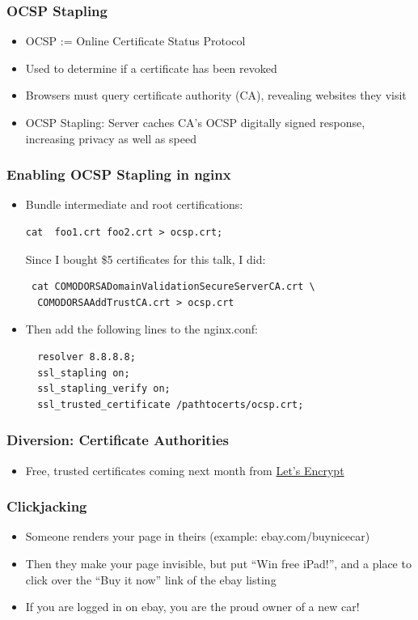 \documentclass[9pt]{beamer}
\begin{document}
\begin{frame}[fragile]
\frametitle{OCSP Stapling}
\begin{itemize}
\item OCSP := Online Certificate Status Protocol
\pause
\item Used to determine if a certificate has been revoked
\pause
\item Browsers must query certificate authority (CA), revealing websites they visit
\pause
\item OCSP Stapling: Server caches CA's OCSP digitally signed response, increasing privacy as well as speed
\end{itemize}
\end{frame}

\begin{frame}[fragile]
\frametitle{Enabling OCSP Stapling in nginx}
\begin{itemize}
\item Bundle intermediate and root certifications:
\begin{verbatim}
cat  foo1.crt foo2.crt > ocsp.crt;
\end{verbatim}
Since I bought \$5 certificates for this talk, I did:
\begin{verbatim}
 cat COMODORSADomainValidationSecureServerCA.crt \
  COMODORSAAddTrustCA.crt > ocsp.crt
\end{verbatim}
\pause
\item Then add the following lines to the nginx.conf:
\begin{verbatim}
  resolver 8.8.8.8;
  ssl_stapling on;
  ssl_stapling_verify on;
  ssl_trusted_certificate /pathtocerts/ocsp.crt;
\end{verbatim}
\end{itemize}
\end{frame}

\begin{frame}[fragile]
\frametitle{Diversion: Certificate Authorities}
\begin{itemize}
\item Free, trusted certificates coming next month from \href{https://letsencrypt.org/}{Let's Encrypt}
\end{itemize}
\end{frame}

\begin{frame}[fragile]
\frametitle{Clickjacking}
\begin{itemize}
\item Someone renders your page in theirs (example: ebay.com/buynicecar)
\pause
\item Then they make your page invisible, but put ``Win free iPad!'', and a place to click over the ``Buy it now'' link of the ebay listing
\pause
\item If you are logged in on ebay, you are the proud owner of a new car!
\end{itemize}
\end{frame}
\end{document}
